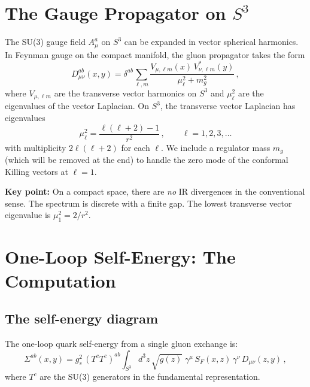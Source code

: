 \documentclass[11pt,a4paper]{article}
\theoremstyle{definition}
\theoremstyle{remark}
\begin{document}
\section{The Gauge Propagator on $S^3$}
\label{sec:gauge-prop}

The SU(3) gauge field $A_\mu^a$ on $S^3$ can be expanded in vector
spherical harmonics.  In Feynman gauge on the compact manifold, the
gluon propagator takes the form
\begin{equation}\label{eq:gluon-prop}
D_{\mu\nu}^{ab}(x,y) = \delta^{ab}\sum_{\ell,m}
\frac{V_{\mu,\ell m}(x)\,V_{\nu,\ell m}^*(y)}{\mu_\ell^2 + m_g^2}\,,
\end{equation}
where $V_{\mu,\ell m}$ are the transverse vector harmonics on $S^3$
and $\mu_\ell^2$ are the eigenvalues of the vector Laplacian.  On $S^3$,
the transverse vector Laplacian has eigenvalues
\begin{equation}\label{eq:vector-eigenvalues}
\mu_\ell^2 = \frac{\ell(\ell+2) - 1}{r^2}\,,\qquad \ell = 1, 2, 3, \ldots
\end{equation}
with multiplicity $2\ell(\ell+2)$ for each $\ell$.  We include a
regulator mass $m_g$ (which will be removed at the end) to handle the
zero mode of the conformal Killing vectors at $\ell = 1$.

\textbf{Key point:} On a compact space, there are \emph{no} IR divergences
in the conventional sense.  The spectrum is discrete with a finite gap.
The lowest transverse vector eigenvalue is $\mu_1^2 = 2/r^2$.

\section{One-Loop Self-Energy: The Computation}
\label{sec:self-energy}

\subsection{The self-energy diagram}

The one-loop quark self-energy from a single gluon exchange is:
\begin{equation}\label{eq:sigma-def}
\Sigma^{ab}(x,y) = g_s^2\,(T^c T^c)^{ab}\int_{S^3}d^3z\,\sqrt{g(z)}
\;\gamma^\mu\,S_F(x,z)\,\gamma^\nu\,D_{\mu\nu}(z,y)\,,
\end{equation}
where $T^c$ are the SU(3) generators in the fundamental representation.
\end{document}

